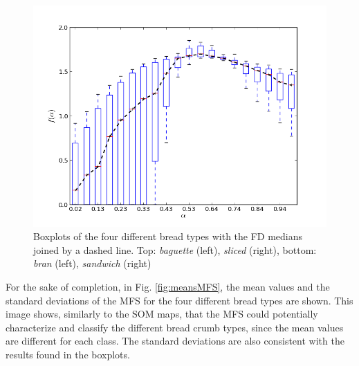 \begin{figure}
\includegraphics[scale=0.4]{../images/boxpSandwichM}
\caption{Boxplots of the four different bread types with the FD medians joined by a dashed line. Top: {\em baguette} (left), {\em sliced} (right), bottom: {\em bran} (left), {\em sandwich} (right)}
\label{fig:boxplotsMFS}
\end{figure}


For the sake of completion, in Fig. \ref{fig:meansMFS}, the mean values and the standard deviations of the MFS for the four different bread types are shown. This image shows, similarly to the SOM maps, that the MFS could potentially characterize and classify the different bread crumb types, since the mean values are different for each class. The standard deviations are also consistent with the results found in the boxplots. 

